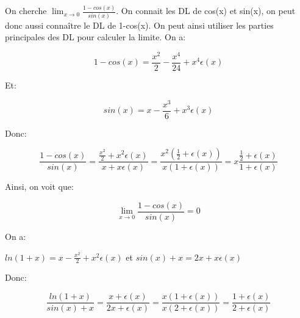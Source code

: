 \documentclass[12pt,a4paper, french]{article}
\begin{document}
 On cherche \begin{math}\lim_{x \to 0}\frac{1-cos(x)}{sin(x)}\end{math}. On connait les DL de cos(x) et sin(x), on peut donc aussi connaître le DL de 1-cos(x). On peut ainsi utiliser les parties principales des DL pour calculer la limite. On a:
 \begin{center}
    \begin{equation*}
        1-cos(x)=\frac{x^2}{2}-\frac{x^4}{24}+x^4\epsilon(x)
    \end{equation*}
\end{center}

Et: 
\begin{center}
    \begin{equation*}
        sin(x)=x-\frac{x^3}{6}+x^3\epsilon(x)
    \end{equation*}
\end{center}

Donc: 
\begin{center}
    \begin{equation*}
        \frac{1-cos(x)}{sin(x)}=\frac{\frac{x^2}{2}+x^2\epsilon(x)}{x+x\epsilon(x)}=\frac{x^2(\frac{1}{2}+\epsilon(x))}{x(1+\epsilon(x))}=x\frac{\frac{1}{2}+\epsilon(x)}{1+\epsilon(x)}
    \end{equation*}
\end{center}

Ainsi, on voit que:
\begin{center}
    \begin{equation*}
        \lim_{x \to 0}\frac{1-cos(x)}{sin(x)}=0
    \end{equation*}
\end{center}

On a:
\begin{center}
    \begin{math}
        ln(1+x)=x-\frac{x^2}{2}+x^2\epsilon(x)\end{math} et \begin{math}
            sin(x)+x=2x+x\epsilon(x)
        \end{math} 
\end{center}

Donc:
\begin{center}
    \begin{equation*}
    \frac{ln(1+x)}{sin(x)+x}=\frac{x+\epsilon(x)}{2x+\epsilon(x)}=\frac{x(1+\epsilon(x))}{x(2+\epsilon(x))}=\frac{1+\epsilon(x)}{2+\epsilon(x)}    
    \end{equation*}
\end{center}
\end{document}
